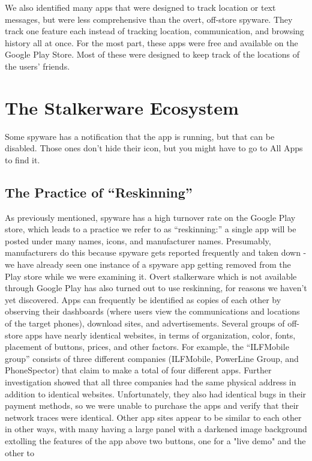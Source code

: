 \documentclass[acmtog]{acmart}
\begin{document}
We also identified many apps that were designed to track location or text 
messages, but were less comprehensive than the overt, off-store spyware. They 
track one feature each instead of tracking location, communication, and 
browsing history all at once. For the most part, these apps were free and 
available on the Google Play Store. Most of these were designed to keep track 
of the locations of the users' friends. 

\section{The Stalkerware Ecosystem}
Some spyware has a notification that the app is running, but that can be 
disabled. Those ones don't hide their icon, but you might have to go to All 
Apps to find it.
\subsection{The Practice of ``Reskinning''}
\label{reskinning}
As previously mentioned, spyware has a high turnover rate on the Google Play 
store, which leads to a practice we refer to as “reskinning:” a single app will 
be posted under many names, icons, and manufacturer names. Presumably, 
manufacturers do this because spyware gets reported frequently and taken down - 
we have already seen one instance of a spyware app getting removed from the 
Play store while we were examining it. Overt stalkerware which is not available 
through Google Play has also turned out to use reskinning, for reasons we 
haven’t yet discovered. Apps can frequently be identified as copies of each 
other by observing their dashboards (where users view the communications and 
locations of the target phones), download sites, and advertisements. Several 
groups of off-store apps have nearly identical websites, in terms of 
organization, color, fonts, placement of buttons, prices, and other factors. 
For example, the “ILFMobile group” consists of three different companies 
(ILFMobile, PowerLine Group, and PhoneSpector) that claim to make a total of 
four different apps. Further investigation showed that all three companies had 
the same physical address in addition to identical websites. Unfortunately, 
they also had identical bugs in their payment methods, so we were unable to 
purchase the apps and verify that their network traces were identical. Other 
app sites appear to be similar to each other in other ways, 
with many having a large panel with a darkened image background extolling the 
features of the app above two buttons, one for a "live demo" and the other to 
\end{document}
